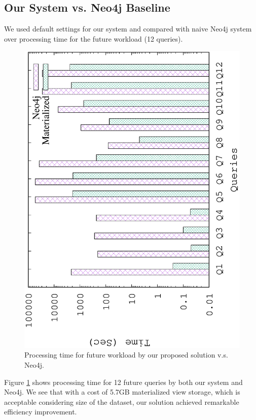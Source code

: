 \subsection{Our System vs. Neo4j Baseline}
We used default settings for our system and compared  with naive Neo4j system over processing time for the future workload (12 queries).


\begin{figure}[H]
	\centering
	\includegraphics[scale=0.5, angle=270]{plot/neo4j}
	\caption{Processing time for future workload by our proposed solution v.s. Neo4j.}
	\label{fig:neo4j}
\end{figure}

Figure \ref{fig:neo4j} shows processing time for 12 future queries by both our system and Neo4j. We see that with a cost of 5.7GB materialized view storage, which is acceptable considering size of the dataset, our solution achieved remarkable efficiency improvement.

